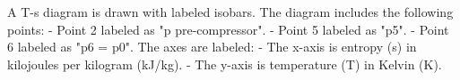 A T-s diagram is drawn with labeled isobars. The diagram includes the following points:  
- Point 2 labeled as "p pre-compressor".  
- Point 5 labeled as "p5".  
- Point 6 labeled as "p6 = p0".  
The axes are labeled:  
- The x-axis is entropy (s) in kilojoules per kilogram (kJ/kg).  
- The y-axis is temperature (T) in Kelvin (K).